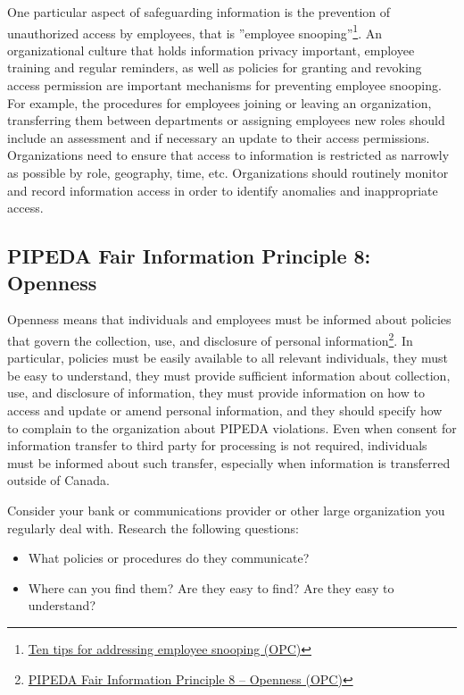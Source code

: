 One particular aspect of safeguarding information is the prevention of unauthorized access by employees, that is ''employee snooping''\footnote{\href{https://www.priv.gc.ca/en/privacy-topics/business-privacy/safeguards-and-breaches/privacy-breaches/02_05_d_65_tips/}{Ten tips for addressing employee snooping (OPC)}}. An organizational culture that holds information privacy important, employee training and regular reminders, as well as policies for granting and revoking access permission are important mechanisms for preventing employee snooping. For example, the procedures for employees joining or leaving an organization, transferring them between departments or assigning employees new roles should include an assessment and if necessary an update to their access permissions. Organizations need to ensure that access to information is restricted as narrowly as possible by role, geography, time, etc. Organizations should routinely monitor and record information access in order to identify anomalies and inappropriate access. 

\subsection*{PIPEDA Fair Information Principle 8: Openness}

Openness means that individuals and employees must be informed about policies that govern the collection, use, and disclosure of personal information\footnote{\href{https://www.priv.gc.ca/en/privacy-topics/privacy-laws-in-canada/the-personal-information-protection-and-electronic-documents-act-pipeda/p_principle/principles/p_openness/}{PIPEDA Fair Information Principle 8 -- Openness (OPC)}}. In particular, policies must be easily available to all relevant individuals, they must be easy to understand, they must provide sufficient information about collection, use, and disclosure of information, they must provide information on how to access and update or amend personal information, and they should specify how to complain to the organization about PIPEDA violations. Even when consent for information transfer to third party for processing is not required, individuals must be informed about such transfer, especially when information is transferred outside of Canada.

\begin{exerciseboxcomputer}

Consider your bank or communications provider or other large organization you regularly deal with. Research the following questions:
\begin{itemize}
  \item What policies or procedures do they communicate?
  \item Where can you find them? Are they easy to find? Are they easy to understand?
\end{itemize}
\end{exerciseboxcomputer}

